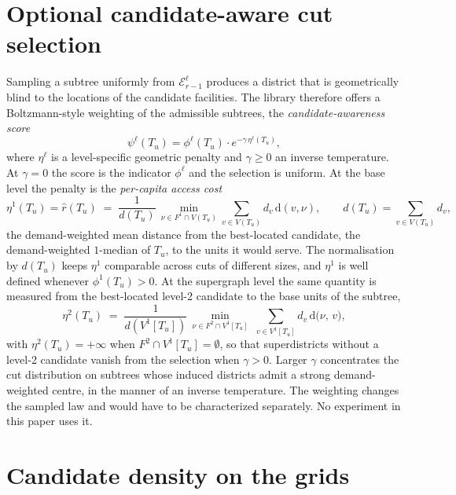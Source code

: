 \documentclass[preprint,12pt,authoryear]{elsarticle}
\theoremstyle{definition}
\begin{document}
\section{Optional candidate-aware cut selection}
\label{app:psi}

Sampling a subtree uniformly from $\mathcal{E}^{\ell}_{r-1}$ produces a
district that is geometrically blind to the locations of the candidate
facilities. The library therefore offers a Boltzmann-style weighting of the
admissible subtrees, the \emph{candidate-awareness score}
\begin{equation}\label{eq:awareness}
    \psi^{\ell}(T_u) = \phi^{\ell}(T_u) \cdot e^{-\gamma\,\eta^{\ell}(T_u)},
\end{equation}
where $\eta^\ell$ is a level-specific geometric penalty and $\gamma \geq 0$ an inverse temperature. At $\gamma = 0$ the score is the indicator $\phi^{\ell}$ and the selection is uniform. At the base level the penalty is the
\emph{per-capita access cost}
\begin{equation}
    \eta^1(T_u) = \hat r(T_u) \;=\; \frac{1}{d(T_u)}\,\min_{\nu \in F^1 \cap V(T_u)} \sum_{v \in V(T_u)} d_v\, \mathrm{d}(v, \nu),
    \qquad d(T_u) = \sum_{v \in V(T_u)} d_v,
\end{equation}
the demand-weighted mean distance from the best-located candidate, the demand-weighted $1$-median of $T_u$, to the units it would serve. The normalisation by $d(T_u)$ keeps $\eta^1$ comparable across cuts of different sizes, and $\eta^1$ is well defined whenever $\phi^1(T_u) > 0$. At the
supergraph level the same quantity is measured from the best-located
level-2 candidate to the base units of the subtree,
\begin{equation}\label{eq:eta-super}
    \eta^{2}(T_u) \;=\; \frac{1}{d(V^1[T_u])}\,\min_{\nu \in F^2 \cap V^1 [T_u]}\; \sum_{v \in V^1[T_u]} d_v\, \mathrm{d}\bigl(\nu,\, v\bigr),
\end{equation}
with $\eta^{2}(T_u) = +\infty$ when $F^2 \cap V^1[T_u] = \emptyset$, so that
superdistricts without a level-2 candidate vanish from the selection when
$\gamma > 0$. Larger $\gamma$ concentrates the cut distribution on subtrees
whose induced districts admit a strong demand-weighted centre, in the manner of
an inverse temperature. The weighting changes the sampled law and would have to be characterized separately. No experiment in this paper uses it.

\section{Candidate density on the grids}
\label{app:density}
\end{document}
